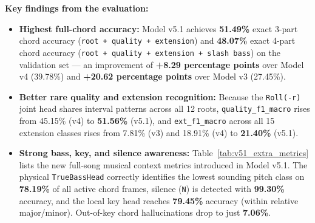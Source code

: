 \documentclass[a4paper]{article}
\begin{document}
\medskip
\textbf{Key findings from the evaluation:}
\begin{itemize}
    \item \textbf{Highest full-chord accuracy:} Model v5.1 achieves \textbf{51.49\%} exact 3-part chord accuracy (\texttt{root + quality + extension}) and \textbf{48.07\%} exact 4-part chord accuracy (\texttt{root + quality + extension + slash bass}) on the validation set --- an improvement of \textbf{+8.29 percentage points} over Model v4 (39.78\%) and \textbf{+20.62 percentage points} over Model v3 (27.45\%).
    \item \textbf{Better rare quality and extension recognition:} Because the \texttt{Roll(-r)} joint head shares interval patterns across all 12 roots, \texttt{quality\_f1\_macro} rises from 45.15\% (v4) to \textbf{51.56\%} (v5.1), and \texttt{ext\_f1\_macro} across all 15 extension classes rises from 7.81\% (v3) and 18.91\% (v4) to \textbf{21.40\%} (v5.1).
    \item \textbf{Strong bass, key, and silence awareness:} Table~\ref{tab:v51_extra_metrics} lists the new full-song musical context metrics introduced in Model v5.1. The physical \texttt{TrueBassHead} correctly identifies the lowest sounding pitch class on \textbf{78.19\%} of all active chord frames, silence (\texttt{N}) is detected with \textbf{99.30\%} accuracy, and the local key head reaches \textbf{79.45\%} accuracy (within relative major/minor). Out-of-key chord hallucinations drop to just \textbf{7.06\%}.
\end{itemize}
\end{document}
